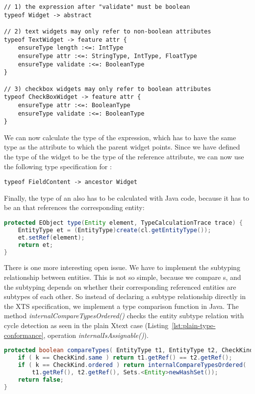 \begin{lstlisting}[language=xts,float,label=lst:xts-widgets,caption=Rules
for widgets.] 
// 1) the expression after "validate" must be boolean
typeof Widget -> abstract

// 2) text widgets may only refer to non-boolean attributes 
typeof TextWidget -> feature attr {
    ensureType length :<=: IntType
    ensureType attr :<=: StringType, IntType, FloatType
    ensureType validate :<=: BooleanType
}  

// 3) checkbox widgets may only refer to boolean attributes
typeof CheckBoxWidget -> feature attr {
    ensureType attr :<=: BooleanType
    ensureType validate :<=: BooleanType
}
\end{lstlisting}


We can now calculate the type of the  expression, which has to have
the same type as  the attribute to which the parent widget points. Since we
have defined the type of the widget to be the type of the reference attribute,
we can now use the following type specification for :

\begin{lstlisting}[language=xts]
typeof FieldContent -> ancestor Widget
\end{lstlisting}

% 

Finally, the type of an  also has to be calculated with Java code, because
it has to be an  that references the corresponding entity:

\begin{lstlisting}[language=Java]
protected EObject type(Entity element, TypeCalculationTrace trace) {
    EntityType et = (EntityType)create(cl.getEntityType());
    et.setRef(element);
    return et;
}
\end{lstlisting}

There is one more interesting open issue. We have to implement the subtyping
relationship between entities. This is not so simple, because we compare
s, and the subtyping depends on whether their corresponding
referenced entities are subtypes of each other. So instead of declaring a
subtype relationship directly in the XTS specification, we implement a type
comparison function in Java. The method \emph{internalCompareTypesOrdered()} checks the entity subtype
relation with cycle detection as seen in the plain Xtext case
(Listing~\ref{lst:plain-type-conformance}, operation
\emph{internalIsAssignable()}).


\begin{lstlisting}[language=Java]
protected boolean compareTypes( EntityType t1, EntityType t2, CheckKind k, TypeCalculationTrace trace ) {
    if ( k == CheckKind.same ) return t1.getRef() == t2.getRef();
    if ( k == CheckKind.ordered ) return internalCompareTypesOrdered(
        t1.getRef(), t2.getRef(), Sets.<Entity>newHashSet());
    return false; 
}
\end{lstlisting}


  
